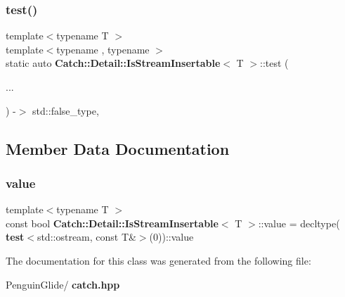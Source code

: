 \mbox{\label{class_catch_1_1_detail_1_1_is_stream_insertable_ac5761375646929916dc5e165d44cd3d9}} 
\subsubsection{test()\hspace{0.1cm}{\footnotesize\ttfamily [2/2]}}
{\footnotesize\ttfamily template$<$typename T $>$ \\
template$<$typename , typename $>$ \\
static auto \textbf{ Catch\+::\+Detail\+::\+Is\+Stream\+Insertable}$<$ T $>$\+::test (\begin{DoxyParamCaption}\item[{}]{... }\end{DoxyParamCaption}) -\/$>$  std\+::false\+\_\+type\hspace{0.3cm}{\ttfamily [static]}, {\ttfamily [private]}}



\subsection{Member Data Documentation}
\mbox{\label{class_catch_1_1_detail_1_1_is_stream_insertable_a42818b09ae5851126a70ee263769e309}} 
\subsubsection{value}
{\footnotesize\ttfamily template$<$typename T $>$ \\
const bool \textbf{ Catch\+::\+Detail\+::\+Is\+Stream\+Insertable}$<$ T $>$\+::value = decltype(\textbf{ test}$<$std\+::ostream, const T\&$>$(0))\+::value\hspace{0.3cm}{\ttfamily [static]}}



The documentation for this class was generated from the following file\+:\begin{DoxyCompactItemize}
\item 
Penguin\+Glide/\textbf{ catch.\+hpp}\end{DoxyCompactItemize}
